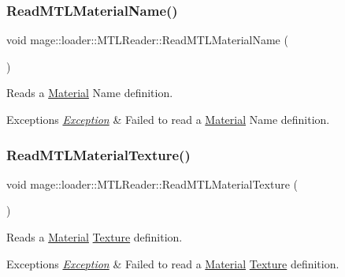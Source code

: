 \subsubsection{\texorpdfstring{Read\+M\+T\+L\+Material\+Name()}{ReadMTLMaterialName()}}
{\footnotesize\ttfamily void mage\+::loader\+::\+M\+T\+L\+Reader\+::\+Read\+M\+T\+L\+Material\+Name (\begin{DoxyParamCaption}{ }\end{DoxyParamCaption})\hspace{0.3cm}{\ttfamily [private]}}

Reads a \hyperlink{classmage_1_1_material}{Material} Name definition.


\begin{DoxyExceptions}{Exceptions}
{\em \hyperlink{classmage_1_1_exception}{Exception}} & Failed to read a \hyperlink{classmage_1_1_material}{Material} Name definition. \\
\hline
\end{DoxyExceptions}
\hypertarget{classmage_1_1loader_1_1_m_t_l_reader_ad22db8ca91554c2eafda3734ad866b24}{}\label{classmage_1_1loader_1_1_m_t_l_reader_ad22db8ca91554c2eafda3734ad866b24} 
\subsubsection{\texorpdfstring{Read\+M\+T\+L\+Material\+Texture()}{ReadMTLMaterialTexture()}}
{\footnotesize\ttfamily void mage\+::loader\+::\+M\+T\+L\+Reader\+::\+Read\+M\+T\+L\+Material\+Texture (\begin{DoxyParamCaption}{ }\end{DoxyParamCaption})\hspace{0.3cm}{\ttfamily [private]}}

Reads a \hyperlink{classmage_1_1_material}{Material} \hyperlink{classmage_1_1_texture}{Texture} definition.


\begin{DoxyExceptions}{Exceptions}
{\em \hyperlink{classmage_1_1_exception}{Exception}} & Failed to read a \hyperlink{classmage_1_1_material}{Material} \hyperlink{classmage_1_1_texture}{Texture} definition. \\
\hline
\end{DoxyExceptions}
\hypertarget{classmage_1_1loader_1_1_m_t_l_reader_a4f4da1e887d1f14f3fcde951df9a4d4d}{}\label{classmage_1_1loader_1_1_m_t_l_reader_a4f4da1e887d1f14f3fcde951df9a4d4d} 
